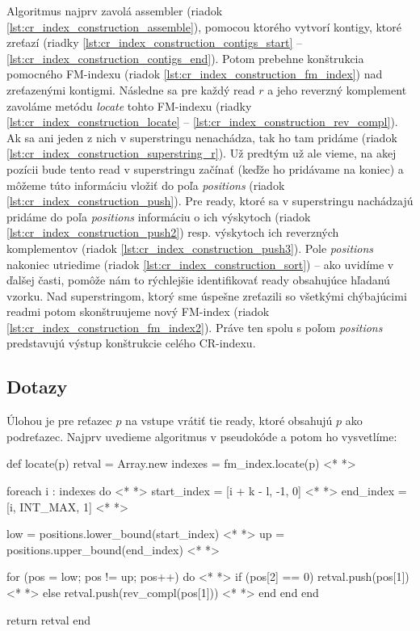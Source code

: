 Algoritmus najprv zavolá assembler (riadok \ref{lst:cr_index_construction_assemble}), pomocou ktorého vytvorí kontigy, ktoré zreťazí (riadky \ref{lst:cr_index_construction_contigs_start} -- \ref{lst:cr_index_construction_contigs_end}). Potom prebehne konštrukcia pomocného FM-indexu (riadok \ref{lst:cr_index_construction_fm_index}) nad zreťazenými kontigmi. Následne sa pre každý read $r$ a jeho reverzný komplement zavoláme metódu \emph{locate} tohto FM-indexu (riadky \ref{lst:cr_index_construction_locate} -- \ref{lst:cr_index_construction_rev_compl}). Ak sa ani jeden z nich v superstringu nenachádza, tak ho tam pridáme (riadok \ref{lst:cr_index_construction_superstring_r}). Už predtým už ale vieme, na akej pozícii bude tento read v superstringu začínať (keďže ho pridávame na koniec) a môžeme túto informáciu vložiť do poľa \emph{positions} (riadok \ref{lst:cr_index_construction_push}). Pre ready, ktoré sa v superstringu nachádzajú pridáme do poľa \emph{positions} informáciu o ich výskytoch (riadok \ref{lst:cr_index_construction_push2}) resp. výskytoch ich reverzných komplementov (riadok \ref{lst:cr_index_construction_push3}). Pole \emph{positions} nakoniec utriedime (riadok \ref{lst:cr_index_construction_sort}) -- ako uvidíme v ďalšej časti, pomôže nám to rýchlejšie identifikovať ready obsahujúce hľadanú vzorku. Nad superstringom, ktorý sme úspešne zreťazili so všetkými chýbajúcimi readmi potom skonštruujeme nový FM-index (riadok \ref{lst:cr_index_construction_fm_index2}). Práve ten spolu s poľom \emph{positions} predstavujú výstup konštrukcie celého CR-indexu.

\subsection{Dotazy}
\label{ssec:dotazy}
Úlohou je pre reťazec $p$ na vstupe vrátiť tie ready, ktoré obsahujú $p$ ako podreťazec. Najprv uvedieme algoritmus v pseudokóde a potom ho vysvetlíme:

\bigskip
\begin{pseudocode}[label=lst:cr_index_query,caption={Algoritmus dotazu \emph{locate} CR-indexu nad readmi bez chýb.}]
def locate(p)
  retval = Array.new
  indexes = fm_index.locate(p) <* \label{lst:cr_index_query_locate} *>  
  
  foreach i : indexes do <* \label{lst:cr_index_query_foreach} *>  
    start_index = [i + k - l, -1, 0] <* \label{lst:cr_index_query_start_index} *>  
    end_index = [i, INT_MAX, 1] <* \label{lst:cr_index_query_end_index} *>  
    
    low = positions.lower_bound(start_index) <* \label{lst:cr_index_query_low} *>  
    up = positions.upper_bound(end_index) <* \label{lst:cr_index_query_up} *>  
    
    for (pos = low; pos != up; pos++) do <* \label{lst:cr_index_query_foreach2} *>
      if (pos[2] == 0)
        retval.push(pos[1]) <* \label{lst:cr_index_query_push_read} *>
      else
        retval.push(rev_compl(pos[1])) <* \label{lst:cr_index_query_push_rev_compl} *>
      end
    end
  end
  
  return retval
end
\end{pseudocode}
\bigskip

